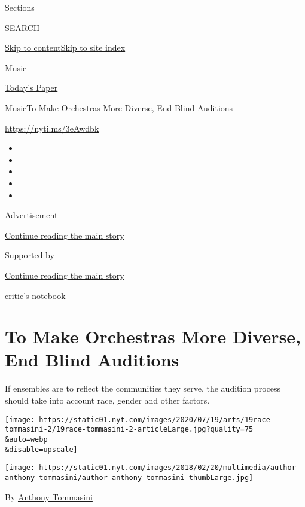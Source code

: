 Sections

SEARCH

\protect\hyperlink{site-content}{Skip to
content}\protect\hyperlink{site-index}{Skip to site index}

\href{https://www.nytimes.com/section/arts/music}{Music}

\href{https://myaccount.nytimes.com/auth/login?response_type=cookie\&client_id=vi}{}

\href{https://www.nytimes.com/section/todayspaper}{Today's Paper}

\href{/section/arts/music}{Music}\textbar{}To Make Orchestras More
Diverse, End Blind Auditions

\href{https://nyti.ms/3eAwdbk}{https://nyti.ms/3eAwdbk}

\begin{itemize}
\item
\item
\item
\item
\item
\end{itemize}

Advertisement

\protect\hyperlink{after-top}{Continue reading the main story}

Supported by

\protect\hyperlink{after-sponsor}{Continue reading the main story}

critic's notebook

\hypertarget{to-make-orchestras-more-diverse-end-blind-auditions}{%
\section{To Make Orchestras More Diverse, End Blind
Auditions}\label{to-make-orchestras-more-diverse-end-blind-auditions}}

If ensembles are to reflect the communities they serve, the audition
process should take into account race, gender and other factors.

\texttt{[image: https://static01.nyt.com/images/2020/07/19/arts/19race-tommasini-2/19race-tommasini-2-articleLarge.jpg?quality=75\\\&auto=webp\\\&disable=upscale]}

\href{https://www.nytimes.com/by/anthony-tommasini}{\texttt{[image: https://static01.nyt.com/images/2018/02/20/multimedia/author-anthony-tommasini/author-anthony-tommasini-thumbLarge.jpg]}}

By \href{https://www.nytimes.com/by/anthony-tommasini}{Anthony
Tommasini}

